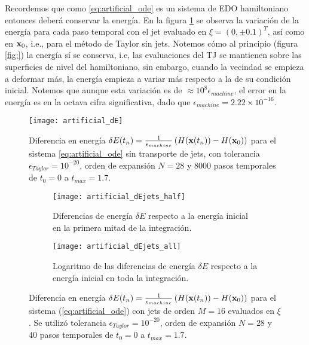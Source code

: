 Recordemos que como \ref{eq:artificial_ode} es un sistema de EDO hamiltoniano entonces deberá conservar la energía. En la figura \ref{fig:artificial_dE} se observa la variación de la energía para cada paso temporal con el jet evaluado en $\xi = (0,\pm 0.1)^T$, así como en $\mathbf{x}_0$, i.e., para el método de Taylor sin jets. Notemos cómo al principio (figura \ref{fig:}) la energía sí se conserva, i.e, las evaluaciones del TJ se mantienen sobre las superficies de nivel del hamiltoniano, sin embargo, cuando la vecindad se empieza a deformar más, la energía empieza a variar más respecto a la de su condición inicial. Notemos que aunque esta variación es de $\approx 10^8 \epsilon_{machine}$, el error en la energía es en la octava cifra significativa, dado que $\epsilon_{machine} = 2.22\times 10^{-16}$.

\begin{figure}[h!]
 \centering
 \texttt{[image: artificial\_dE]}
 \caption{Diferencia en energía $\delta E(t_n) = \frac{1}{\epsilon_{machine}} \left( H(\mathbf{x}(t_n)) - H(\mathbf{x}_0) \right)$ para el sistema \ref{eq:artificial_ode} sin transporte de jets, con tolerancia $\epsilon_{Taylor} = 10^{-20}$, orden de expansión $N = 28$ y $8000$ pasos temporales de $t_0 = 0$ a $t_{max} = 1.7$.}
 \label{fig:artificial_dE}
\end{figure}

\begin{figure}[h!]
\centering
\begin{subfigure}{0.49\textwidth}
	\centering
	\texttt{[image: artificial\_dEjets\_half]}
	\caption{Diferencias de energía $\delta E$ respecto a la energía inicial en la primera mitad de la integración.}
	\label{fig:artificial_dEjets_half}
\end{subfigure}
%
\begin{subfigure}{0.49\textwidth}
	\centering
	\texttt{[image: artificial\_dEjets\_all]}
	\caption{Logaritmo de las diferencias de energía $\delta E$ respecto a la energía inicial en toda la integración.}
	\label{fig:artificial_dEjets_all}
\end{subfigure}
\caption{Diferencia en energía $\delta E(t_n) = \frac{1}{\epsilon_{machine}} \left( H(\mathbf{x}(t_n)) - H(\mathbf{x}_0) \right)$ para el sistema (\ref{eq:artificial_ode}) con jets de orden $M=16$ evaluados en $\xi$. Se utilizó tolerancia $\epsilon_{Taylor} = 10^{-20}$, orden de expansión $N = 28$ y $40$ pasos temporales de $t_0 = 0$ a $t_{max} = 1.7$.}
\label{fig:pendulum_jt}
\end{figure}


